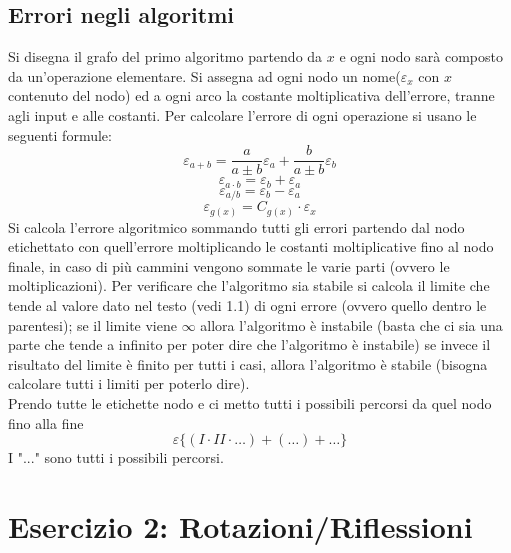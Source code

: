 \documentclass[10pt]{article}
\begin{document}
\subsection{Errori negli algoritmi}
Si disegna il grafo del primo algoritmo partendo da $x$ e ogni nodo sarà composto da un'operazione elementare. Si assegna ad ogni nodo un nome($\varepsilon_{x}$ con $x$ contenuto del nodo) ed a ogni arco la costante moltiplicativa dell'errore, tranne agli input e alle costanti. Per calcolare l'errore di ogni operazione si usano le seguenti formule:
\begin{equation*}
    \varepsilon_{a+b}=\frac{a}{a\pm b}\varepsilon_{a}+\frac{b}{a\pm b}\varepsilon_{b}
\end{equation*}
\begin{equation*}
    \varepsilon_{a\cdot b}=\varepsilon_{b}+\varepsilon_{a}
\end{equation*}
\begin{equation*}
    \varepsilon_{a/b}=\varepsilon_{b}-\varepsilon_{a}
\end{equation*}
\begin{equation*}
    \varepsilon_{g(x)}=C_{g(x)}\cdot \varepsilon_{x}
\end{equation*}
Si calcola l'errore algoritmico sommando tutti gli errori partendo dal nodo etichettato con quell'errore moltiplicando le costanti moltiplicative fino al nodo finale, in caso di più cammini vengono sommate le varie parti (ovvero le moltiplicazioni). Per verificare che l'algoritmo sia stabile si calcola il limite che tende al valore dato nel testo (vedi 1.1) di ogni errore (ovvero quello dentro le parentesi); se il limite viene $\infty$ allora l'algoritmo è instabile (basta che ci sia una parte che tende a infinito per poter dire che l'algoritmo è instabile) se invece il risultato del limite è finito per tutti i casi, allora l'algoritmo è stabile (bisogna calcolare tutti i limiti per poterlo dire).\\
Prendo tutte le etichette nodo e ci metto tutti i possibili percorsi da quel nodo fino alla fine
\begin{equation*}
    \varepsilon\{(I\cdot II\cdot\ldots)+(\ldots)+\ldots\}
\end{equation*}
I "..." sono tutti i possibili percorsi.
\newpage
\section{Esercizio 2: Rotazioni/Riflessioni}
\end{document}

